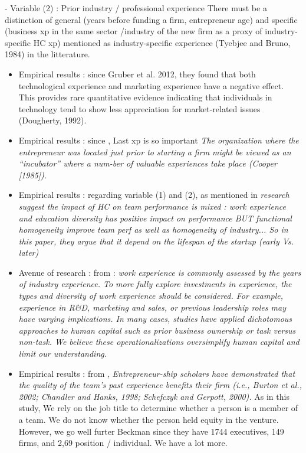 \begin{itemize}
\begin{itemize}
- Variable (2) : Prior industry / professional experience
There must be a distinction of general (years before funding a firm, entrepreneur age) and specific (business xp in the same sector /industry of the new firm as a proxy of industry-specific HC xp) mentioned as industry-specific experience (Tyebjee and Bruno, 1984) in the litterature.
\begin{itemize}
  \item Empirical results : since Gruber et al. 2012, they found that both technological experience and marketing experience have a negative effect. This provides rare quantitative evidence indicating that individuals in technology tend to show less appreciation for market-related issues (Dougherty, 1992).
  \item Empirical results : since \citep{cooper1994initial}, Last xp is so important \textit{The organization where the entrepreneur was located just prior to starting a firm might be viewed as an “incubator” where a num-ber of valuable experiences take place (Cooper [1985]).}
  \item Empirical results : regarding variable (1) and (2), as mentioned in \citep{steffens2012birds} \textit{research suggest the impact of HC on team performance is mixed : work experience and education diversity has positive impact on performance BUT functional homogeneity improve team perf as well as homogeneity of industry... So in this paper, they argue that it depend on the lifespan of the startup (early Vs. later)}
  \item Avenue of research : from \citep{marvel2016human} : \textit{work experience is commonly assessed by the years of industry experience. To more fully explore investments in experience, the types and diversity of work experience should be considered. For example, experience in R&D, marketing and sales, or previous leadership roles may have varying implications. In many cases, studies have applied dichotomous approaches to human capital such as prior business ownership or task versus non-task. We believe these operationalizations oversimplify human capital and limit our understanding.}
  \item Empirical results : from \citet{beckman2007early}, \textit{Entrepreneur-ship scholars have demonstrated that the quality of the team’s past experience benefits their firm (i.e., Burton et al., 2002; Chandler and Hanks, 1998; Schefczyk and Gerpott, 2000).} As in this study, We rely on the job title to determine whether a person is a member of a team. We do not know whether the person held equity in the venture. However, we go well furter Beckman since they have 1744 executives, 149 firms, and 2,69 position / individual. We have a lot more.

\end{itemize}
\end{itemize}
\end{itemize}
